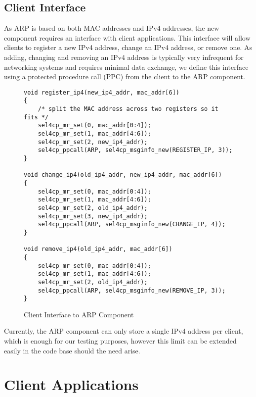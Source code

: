 \subsection{Client Interface}
As ARP is based on both MAC addresses and IPv4 addresses, the new component
requires an interface with client applications. This interface will allow clients
to register a new IPv4 address, change an IPv4 address, or remove one. As adding,
changing and removing an IPv4 address is typically very infrequent for networking systems
and requires minimal data exchange, we define this interface using a protected procedure
call (PPC) from the client to the ARP component. 

\begin{figure} [H]
    \begin{verbatim}
void register_ip4(new_ip4_addr, mac_addr[6])
{
    /* split the MAC address across two registers so it fits */
    sel4cp_mr_set(0, mac_addr[0:4]);
    sel4cp_mr_set(1, mac_addr[4:6]);
    sel4cp_mr_set(2, new_ip4_addr);
    sel4cp_ppcall(ARP, sel4cp_msginfo_new(REGISTER_IP, 3));
}

void change_ip4(old_ip4_addr, new_ip4_addr, mac_addr[6])
{
    sel4cp_mr_set(0, mac_addr[0:4]);
    sel4cp_mr_set(1, mac_addr[4:6]);
    sel4cp_mr_set(2, old_ip4_addr);
    sel4cp_mr_set(3, new_ip4_addr);
    sel4cp_ppcall(ARP, sel4cp_msginfo_new(CHANGE_IP, 4));
}

void remove_ip4(old_ip4_addr, mac_addr[6])
{
    sel4cp_mr_set(0, mac_addr[0:4]);
    sel4cp_mr_set(1, mac_addr[4:6]);
    sel4cp_mr_set(2, old_ip4_addr);
    sel4cp_ppcall(ARP, sel4cp_msginfo_new(REMOVE_IP, 3));
}
\end{verbatim}
\caption{Client Interface to ARP Component}
\label{l:arpintf}
\end{figure}

Currently, the ARP component can only store a single IPv4 address per client, which
is enough for our testing purposes, however this limit can be extended easily in the code
base should the need arise.\\

\section{Client Applications}

